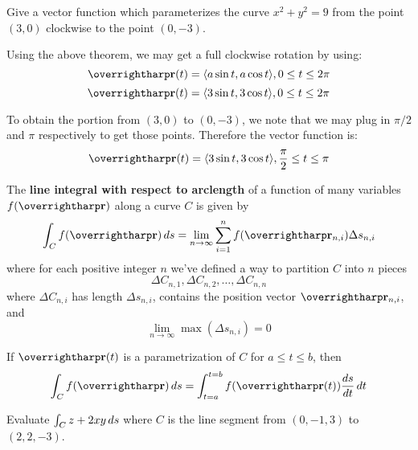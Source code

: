 \documentclass[letterpaper, twoside, 12pt]{book}
\begin{document}
          \begin{problem}
            Give a vector function which parameterizes the curve
            $x^2+y^2=9$ from the point $(3,0)$ clockwise to the point $(0,-3)$.
          \end{problem}

          \begin{solution}
            Using the above theorem, we may get a full clockwise rotation
            by using:
              \[
                \vect{r}(t) = \<a\sin t,a\cos t\>, 0\leq t\leq 2\pi
              \]
              \[
                \vect{r}(t) = \<3\sin t,3\cos t\>, 0\leq t\leq 2\pi
              \]

            To obtain the portion from \((3,0)\) to \((0,-3)\), we note
            that we may plug in \(\pi/2\) and \(\pi\) respectively to
            get those points.
            Therefore the vector function is:
              \[
                \vect{r}(t) = \<3\sin t,3\cos t\>, \frac{\pi}{2}\leq t\leq \pi
              \]
          \end{solution}

\begin{definition}
The \textbf{line integral with respect to arclength} of a function of many
variables $f(\vect{r})$ along a curve $C$ is given by
  \[
    \int_C f(\vect{r})\dvar{s} =
    \lim_{n\to\infty}\sum_{i=1}^n f(\vect{r}_{n,i})\Delta s_{n,i}
  \]
where for each positive integer $n$ we've defined a way to partition $C$
into $n$ pieces
  \[
    \Delta C_{n,1},\Delta C_{n,2},\dots,\Delta C_{n,n}
  \]
where $\Delta C_{n,i}$ has length $\Delta s_{n,i}$, contains the position
vector $\vect{r}_{n,i}$, and
  \[
    \lim_{n\to\infty} \max(\Delta s_{n,i}) = 0
  \]
\end{definition}

\begin{theorem}
If $\vect{r}(t)$ is a parametrization of $C$ for $a \leq t \leq b$, then
  \[
    \int_C f(\vect{r})\dvar{s}
    =\int_{t=a}^{t=b} f(\vect{r}(t))\frac{ds}{dt}\dvar{t}
  \]
\end{theorem}

          \begin{problem}
            Evaluate $\int_C z + 2xy\,d{s}$ where $C$ is the line segment
            from $(0,-1,3)$ to $(2,2,-3)$.
          \end{problem}
\end{document}
